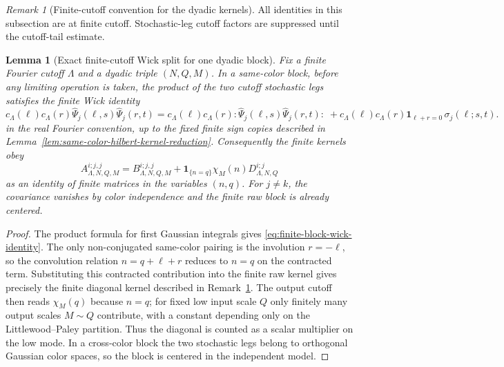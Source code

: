 \documentclass[10pt]{amsart}
\numberwithin{equation}{section}
\theoremstyle{plain}
\newtheorem{lemma}[theorem]{Lemma}
\theoremstyle{definition}
\theoremstyle{remark}
\newtheorem{remark}[theorem]{Remark}
\begin{document}
\begin{remark}[Finite-cutoff convention for the dyadic kernels]\label{rem:finite-cutoff-dyadic-kernel-convention}
All identities in this subsection are at finite cutoff.  Stochastic-leg cutoff factors are suppressed until the cutoff-tail estimate.
\end{remark}


\begin{lemma}[Exact finite-cutoff Wick split for one dyadic block]\label{lem:finite-cutoff-wick-block}
Fix a finite Fourier cutoff $\Lambda$ and a dyadic triple $(N,Q,M)$.  In a same-color block, before any limiting operation is taken, the product of the two cutoff stochastic legs satisfies the finite Wick identity
\begin{equation}\label{eq:finite-block-wick-identity}
        c_\Lambda(\ell)c_\Lambda(r)\widehat\Psi_j(\ell,s)\widehat\Psi_j(r,t)
        =c_\Lambda(\ell)c_\Lambda(r):\widehat\Psi_j(\ell,s)\widehat\Psi_j(r,t):\;+
        c_\Lambda(\ell)c_\Lambda(r)\mathbf 1_{\ell+r=0}\,\sigma_j(\ell;s,t).
\end{equation}
in the real Fourier convention, up to the fixed finite sign copies described in Lemma~\ref{lem:same-color-hilbert-kernel-reduction}.  Consequently the finite kernels obey
\begin{equation}\label{eq:finite-block-A-B-D-identity}
        A_{\Lambda,N,Q,M}^{i;j,j}
        =B_{\Lambda,N,Q,M}^{i;j,j}
         +\mathbf 1_{\{n=q\}}\chi_M(n)D_{\Lambda,N,Q}^{i;j}
\end{equation}
as an identity of finite matrices in the variables $(n,q)$.  For $j\ne k$, the covariance vanishes by color independence and the finite raw block is already centered.
\end{lemma}

\begin{proof}
The product formula for first Gaussian integrals gives \eqref{eq:finite-block-wick-identity}.  The only non-conjugated same-color pairing is the involution $r=-\ell$, so the convolution relation $n=q+\ell+r$ reduces to $n=q$ on the contracted term.  Substituting this contracted contribution into the finite raw kernel gives precisely the finite diagonal kernel described in Remark~\ref{rem:finite-cutoff-dyadic-kernel-convention}.  The output cutoff then reads $\chi_M(q)$ because $n=q$; for fixed low input scale $Q$ only finitely many output scales $M\sim Q$ contribute, with a constant depending only on the Littlewood--Paley partition.  Thus the diagonal is counted as a scalar multiplier on the low mode.  In a cross-color block the two stochastic legs belong to orthogonal Gaussian color spaces, so the block is centered in the independent model.
\end{proof}
\end{document}
